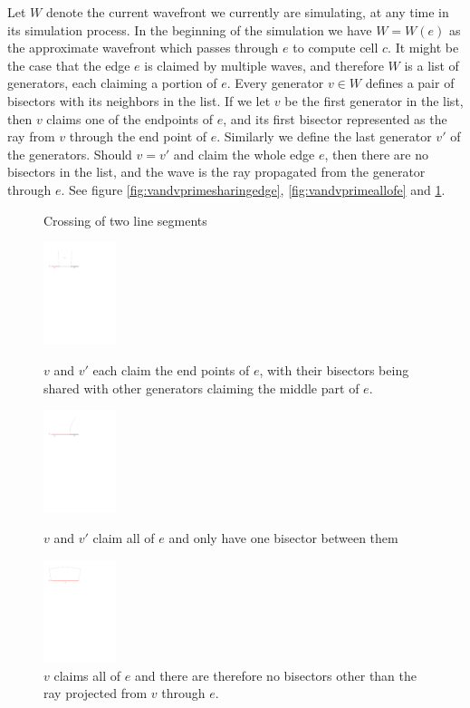 Let $W$ denote the current wavefront we currently are simulating, at any time in its simulation process. In the 
beginning of the simulation we have $W = W(e)$ as the approximate wavefront which passes through $e$ to compute cell
$c$. It might be the case that the edge $e$ is claimed by multiple waves, and therefore $W$ is a list of generators,
each claiming a portion of $e$. Every generator $v \in W$ defines a pair of bisectors with its neighbors in the 
list. If we let $v$ be the first generator in the list, then $v$ claims one of the endpoints of $e$, and its first 
bisector represented as the ray from $v$ through the end point of $e$. Similarly we define the last generator $v'$ 
of the generators. Should $v = v'$ and claim the whole edge $e$, then there are no bisectors in the list, and the 
wave is the ray propagated from the generator through $e$. See figure \ref{fig:vandvprimesharingedge}, \ref{fig:vandvprimeallofe} and \ref{fig:visallofe}.

\begin{figure}[H]
	\caption{Crossing of two line segments}
		\includegraphics[height=3cm]{figures/vandvprimesharingedge.pdf}
		\caption{$v$ and $v'$ each claim the end points of $e$, with their bisectors being shared with other generators claiming the middle part of $e$.}
		\label{fig:vandvprimesharingedge}
	\endminipage\hfill
		\includegraphics[height=3cm]{figures/vandvprimeallofe.pdf}
		\caption{$v$ and $v'$ claim all of $e$ and only have one bisector between them}
		\label{fig:vandvprimeallofe}
	\endminipage\hfill
	\centering
		\includegraphics[height=3cm]{figures/visallofe.pdf}
		\caption{$v$ claims all of $e$ and there are therefore no bisectors other than the ray projected from $v$ through $e$.}
		\label{fig:visallofe}
		\endminipage\hfill
\end{figure}

